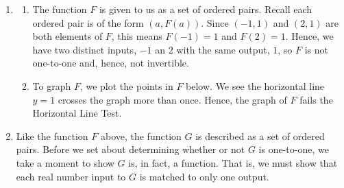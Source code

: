 \documentclass{ximera}
\begin{document}
\begin{example}
\begin{explanation}
\begin{enumerate}
\begin{enumerate}
\begin{center}
\end{center}


\end{enumerate}

\item  \begin{enumerate} \item The function $F$ is given to us as a set of ordered pairs. Recall each ordered pair is of the form $(a, F(a))$.  Since  $(-1,1)$ and $(2,1)$ are both elements of $F$, this means $F(-1)=1$ and $F(2) = 1$.  Hence, we have two distinct inputs, $-1$ an $2$ with the same output, $1$, so $F$ is not one-to-one and, hence, not invertible.

\item  To graph $F$, we plot the points in $F$ below.  We see the horizontal line $y=1$ crosses the graph more than once.  Hence, the graph of $F$ fails the Horizontal Line Test.

  \begin{image}
% 
 \end{image}

\end{enumerate}

\item  Like the function $F$ above, the function $G$ is described as a set of ordered pairs.  Before we set about determining whether or not $G$ is one-to-one, we take a moment to show $G$ is, in fact, a function. That is, we must show that each real number input to $G$ is matched to only one output.  


\end{enumerate}
\end{explanation}
\end{example}
\end{document}
